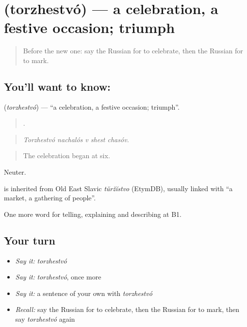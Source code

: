 \section[\texorpdfstring{\ru{торжество} (torzhestvó)}{торжество (torzhestvó)}]{ (torzhestvó) — a celebration, a festive occasion; triumph}

\label{lesson:RU-C311-torzhestvo}



\begin{quote}
Before the new one: say the Russian for to celebrate, then the Russian for to mark.
\end{quote}

\subsection*{You'll want to know: }
\textbf{} (\emph{torzhestvó}) — \textquotedblleft{}a celebration, a festive occasion; triumph\textquotedblright{}.

\begin{quote}
    .
\end{quote}

\begin{quote}
\emph{Torzhestvó nachalós v shest chasóv.}
\end{quote}

\begin{quote}
The celebration began at six.
\end{quote}

Neuter.

\begin{cousinweb}
\emph{} is inherited from Old East Slavic \emph{tŭržĭstvo} (EtymDB), usually linked with \emph{} \textquotedblleft{}a market, a gathering of people\textquotedblright{}.
\end{cousinweb}

\begin{grammarlens}[title={What you've built}]
One more word for telling, explaining and describing at B1.
\end{grammarlens}

\subsection*{Your turn}
\begin{itemize}
\raggedright
  \item \emph{Say it:} \emph{torzhestvó}
  \item \emph{Say it:} \emph{torzhestvó}, once more
  \item \emph{Say it:} a sentence of your own with \emph{torzhestvó}
  \item \emph{Recall:} say the Russian for to celebrate, then the Russian for to mark, then say \emph{torzhestvó} again
\end{itemize}

